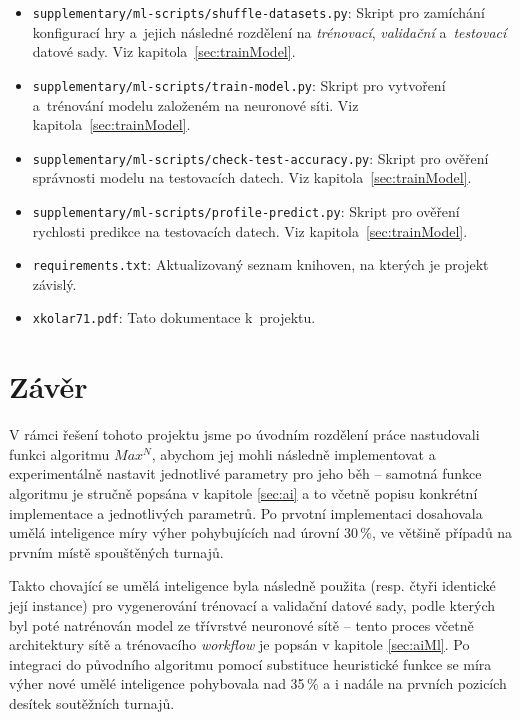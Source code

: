 \documentclass[11pt, a4paper]{article}
\theoremstyle{definition}
\begin{document}
\begin{itemize}
    \item
        \texttt{supplementary/ml-scripts/shuffle-datasets.py}: Skript pro zamíchání
        konfigurací hry a~jejich následné rozdělení na \emph{trénovací},
        \emph{validační} a~\emph{testovací} datové sady. Viz
        kapitola~\ref{sec:trainModel}.

    \item
        \texttt{supplementary/ml-scripts/train-model.py}: Skript pro vytvoření a~trénování
        modelu založeném na neuronové síti. Viz kapitola~\ref{sec:trainModel}.

    \item
        \texttt{supplementary/ml-scripts/check-test-accuracy.py}: Skript pro ověření
        správnosti modelu na testovacích datech. Viz
        kapitola~\ref{sec:trainModel}.
        
    \item
        \texttt{supplementary/ml-scripts/profile-predict.py}: Skript pro ověření
        rychlosti predikce na testovacích datech. Viz
        kapitola~\ref{sec:trainModel}.


    \item
        \texttt{requirements.txt}: Aktualizovaný seznam knihoven, na
        kterých je projekt závislý.

    \item
        \texttt{xkolar71.pdf}: Tato dokumentace k~projektu.
\end{itemize}


\section{Závěr}
\label{sec:con}

V rámci řešení tohoto projektu jsme po úvodním rozdělení práce nastudovali funkci algoritmu $ Max^N $, abychom jej mohli následně implementovat a experimentálně nastavit jednotlivé parametry pro jeho běh -- samotná funkce algoritmu je stručně popsána v kapitole \ref{sec:ai} a to včetně popisu konkrétní implementace a jednotlivých parametrů. Po prvotní implementaci dosahovala umělá inteligence míry výher pohybujících nad úrovní 30\,\%, ve většině případů na prvním místě spouštěných turnajů.

Takto chovající se umělá inteligence byla následně použita (resp. čtyři identické její instance) pro vygenerování trénovací a validační datové sady, podle kterých byl poté natrénován model ze třívrstvé neuronové sítě -- tento proces včetně architektury sítě a trénovacího \emph{workflow} je popsán v kapitole \ref{sec:aiMl}. Po integraci do původního algoritmu pomocí substituce heuristické funkce se míra výher nové umělé inteligence pohybovala nad 35\,\% a i nadále na prvních pozicích desítek soutěžních turnajů.
\end{document}
